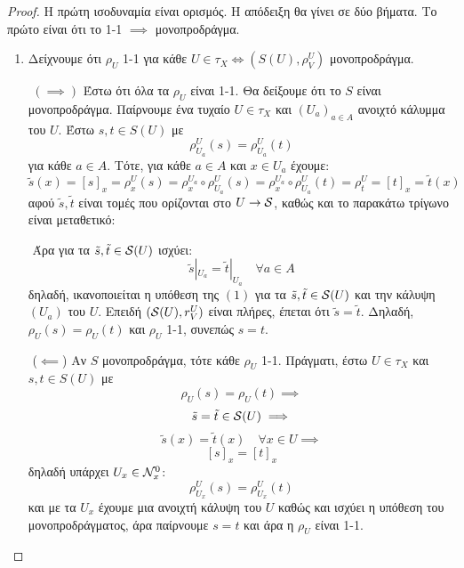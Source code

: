 \begin{proof} Η πρώτη ισοδυναμία είναι ορισμός. Η απόδειξη θα γίνει σε δύο βήματα. Το πρώτο είναι ότι το 1-1 $\implies$ μονοπροδράγμα.
    \begin{enumerate}
        \item Δείχνουμε ότι $\rho_U$ 1-1 για κάθε $U \in \tau_X \iff (S(U),\rho^U_V)$ μονοπροδράγμα.
        
        $ $\newline
        $(\implies)$ Έστω ότι όλα τα $\rho_U$ είναι 1-1. Θα δείξουμε ότι το $S$ είναι μονοπροδράγμα. Παίρνουμε ένα τυχαίο $U \in \tau_X$ και $(U_a)_{a \in A}$ ανοιχτό κάλυμμα του $U$. Έστω $s,t \in S(U)$ με
        $$\rho^U_{U_a} (s) = \rho^U_{U_a} (t)$$ για κάθε $a \in A$. Τότε, για κάθε $a \in A$ και $x \in U_a$ έχουμε:
        $$\tilde{s}(x) = [s]_x = \rho^U_x(s) = \rho^{U_a}_x \circ \rho^U_{U_a} (s) = \rho^{U_a}_x \circ \rho^U_{U_a} (t) = \rho^U_t = [t]_x = \tilde{t}(x)$$ αφού $\tilde{s},\tilde{t}$ είναι τομές που ορίζονται στο $U \rightarrow \mathcal{S}$, καθώς και το παρακάτω τρίγωνο είναι μεταθετικό:

        \begin{figure}[H]
            \centering
        \end{figure}

        $ $\newline
        Άρα για τα $\tilde{s},\tilde{t} \in \mathcal{S} (U)$ ισχύει:
        $$\tilde{s}|_{U_a} = \tilde{t}|_{U_a} \quad \forall a \in A$$ δηλαδή, ικανοποιείται η υπόθεση της $(1)$ για τα $\tilde{s},\tilde{t} \in \mathcal{S} (U)$ και την κάλυψη $(U_a)$ του $U$. Επειδή $(\mathcal{S} (U),r^U_V)$ είναι πλήρες, έπεται ότι $\tilde{s} = \tilde{t}$. Δηλαδή, $\rho_U(s) = \rho_U(t)$ και $\rho_U$ 1-1, συνεπώς $s=t$.
        
        $ $\newline
        ($\impliedby$) Αν $S$ μονοπροδράγμα, τότε κάθε $\rho_U$ 1-1. Πράγματι, έστω $U \in \tau_X$ και $s,t \in S(U)$ με
        $$\rho_U (s) = \rho_U (t) \implies $$
        $$\tilde{s} = \tilde{t} \in \mathcal{S} (U) \implies $$
        $$\tilde{s} (x) = \tilde{t}(x) \quad \forall x \in U \implies $$
        $$[s]_x = [t]_x $$ δηλαδή υπάρχει $U_x \in \mathcal{N}^0_x$:
        $$\rho^U_{U_x} (s)  = \rho^U_{U_x}(t)$$ και με τα $U_x$ έχουμε μια ανοιχτή κάλυψη του $U$ καθώς και ισχύει η υπόθεση του μονοπροδράγματος, άρα παίρνουμε $s=t$ και άρα η $\rho_U$ είναι 1-1.


\end{enumerate}
\end{proof}
